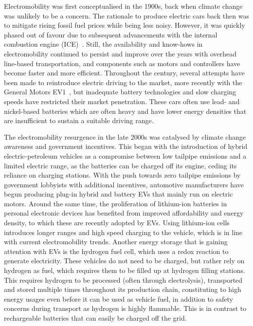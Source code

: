 Electromobility was first conceptualised in the 1900s, back when climate change was unlikely to be a concern. The rationale to produce electric cars back then was to mitigate rising fossil fuel prices while being less noisy. However, it was quickly phased out of favour due to subsequent advancements with the internal combustion engine (ICE)~\cite{kirsch_electric_2000}. Still, the availability and know-hows in electromobility continued to persist and improve over the years with overhead line-based transportation, and components such as motors and controllers have become faster and more efficient. Throughout the century, several attempts have been made to reintroduce electric driving to the market, more recently with the General Motors EV1~\cite{johnson_environmental_1999}, but inadequate battery technologies and slow charging speeds have restricted their market penetration. These cars often use lead- and nickel-based batteries which are often heavy and have lower energy densities that are insufficient to sustain a suitable driving range.

The electromobility resurgence in the late 2000s was catalysed by climate change awareness and government incentives. This began with the introduction of hybrid electric-petroleum vehicles as a compromise between low tailpipe emissions and a limited electric range, as the batteries can be charged off its engine, ceding its reliance on charging stations. With the push towards zero tailpipe emissions by government lobbyists with additional incentives, automotive manufacturers have begun producing plug-in hybrid and battery EVs that mainly run on electric motors. Around the same time, the proliferation of lithium-ion batteries in personal electronic devices has benefited from improved affordability and energy density, to which these are recently adopted by EVs. Using lithium-ion cells introduces longer ranges and high speed charging to the vehicle, which is in line with current electromobility trends. Another energy storage that is gaining attention with EVs is the hydrogen fuel cell, which uses a redox reaction to generate electricity. These vehicles do not need to be charged, but rather rely on hydrogen as fuel, which requires them to be filled up at hydrogen filling stations. This requires hydrogen to be processed (often through electrolysis), transported and stored multiple times throughout its production chain, constituting to high energy usages even before it can be used as vehicle fuel, in addition to safety concerns during transport as hydrogen is highly flammable. This is in contrast to rechargeable batteries that can easily be charged off the grid.

